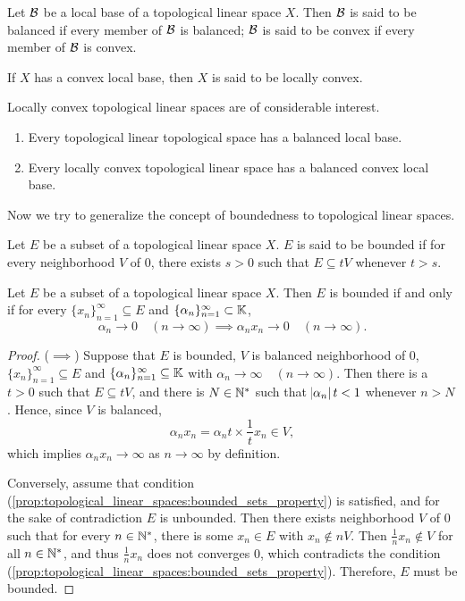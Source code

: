 \begin{defn}
Let $\mathcal{B}$ be a local base of a topological linear space $X$. 
Then $\mathcal{B}$ is said to be balanced if every member of $\mathcal{B}$ is balanced; 
$\mathcal{B}$ is said to be convex if every member of $\mathcal{B}$ is convex. 

If $X$ has a convex local base, then $X$ is said to be locally convex. 
\end{defn}
Locally convex topological linear spaces are of considerable interest. 
\begin{cor}
\begin{enumerate}
    \item Every topological linear topological space has a balanced local 
    base. 
    \item Every locally convex topological linear space has a balanced 
    convex local base. 
\end{enumerate}
\end{cor}

Now we try to generalize the concept of boundedness to topological linear 
spaces. 
\begin{defn}
Let $E$ be a subset of a topological linear space $X$. 
$E$ is said to be bounded if for every neighborhood $V$ of $0$, there 
exists $s > 0$ such that $E \subseteq t V$ whenever $t > s$. 
\end{defn}
\begin{prop}
\label{prop:topological_linear_spaces:bounded_sets_property}
Let $E$ be a subset of a topological linear space $X$. 
Then $E$ is bounded if and only if for every $\{ x_n \}_{n=1}^{\infty} 
\subseteq E$ and $\{ \alpha_n \}_{n=1}^{\infty} \subset \mathbb{K}$, 
\begin{equation}
    \label{equ:topological_linear_spaces:bounded_sets_property}
    \alpha_n \to 0 \quad (n \to \infty) 
    \implies \alpha_n x_n \to 0 \quad (n \to \infty).
\end{equation} 
\end{prop}
\begin{proof}
($\implies$)
Suppose that $E$ is bounded, $V$ is balanced neighborhood of $0$, $\{ x_n \}
_{n=1}^{\infty} \subseteq E$ and $\{ \alpha_n \}_{n=1}^{\infty} \subseteq 
\mathbb{K}$ with $\alpha_n \to \infty \quad (n \to \infty)$. 
Then there is a $t > 0$ such that $E \subseteq tV$, and there is $N \in 
\mathbb{N}^\ast$ such that $\abs{\alpha_n} t < 1$ whenever $n > N$. 
Hence, since $V$ is balanced, 
\begin{equation*}
    \alpha_n x_n = \alpha_n t \times \frac{1}{t} x_n \in V, 
\end{equation*}
which implies $\alpha_n x_n \to \infty$ as $n \to \infty$ by definition. 

Conversely, assume that condition 
(\ref{prop:topological_linear_spaces:bounded_sets_property}) is satisfied, 
and for the sake of contradiction $E$ is unbounded. 
Then there exists neighborhood $V$ of $0$ such that for every $n \in \mathbb{N}^\ast$, 
there is some $x_n \in E$ with $x_n \notin n V$. 
Then $\frac{1}{n} x_n \notin V$ for all $n \in \mathbb{N}^\ast$, and thus 
$\frac{1}{n}x_n$ does not converges $0$, which contradicts the condition  
(\ref{prop:topological_linear_spaces:bounded_sets_property}). 
Therefore, $E$ must be bounded. 
\end{proof}

